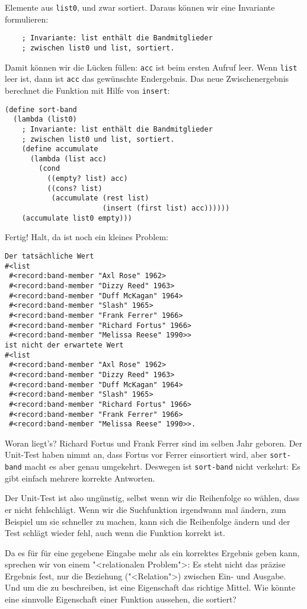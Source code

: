 Elemente aus \lstinline{list0}, und zwar sortiert.  Daraus können wir
eine Invariante formulieren:
%
\begin{lstlisting}
    ; Invariante: list enthält die Bandmitglieder
    ; zwischen list0 und list, sortiert.
\end{lstlisting}
%
Damit können wir die Lücken füllen: \lstinline{acc} ist beim ersten
Aufruf leer.  Wenn \lstinline{list} leer ist, dann ist \lstinline{acc}
das gewünschte Endergebnis.  Das neue Zwischenergebnis berechnet die
Funktion mit Hilfe von \lstinline{insert}:
%
\begin{lstlisting}
(define sort-band
  (lambda (list0)
    ; Invariante: list enthält die Bandmitglieder
    ; zwischen list0 und list, sortiert.
    (define accumulate     
      (lambda (list acc)
        (cond
          ((empty? list) acc)
          ((cons? list)
           (accumulate (rest list)
                       (insert (first list) acc))))))
    (accumulate list0 empty)))
\end{lstlisting}
%
Fertig! Halt, da ist noch ein kleines Problem:
%
\begin{verbatim}
Der tatsächliche Wert 
#<list
 #<record:band-member "Axl Rose" 1962>
 #<record:band-member "Dizzy Reed" 1963>
 #<record:band-member "Duff McKagan" 1964>
 #<record:band-member "Slash" 1965>
 #<record:band-member "Frank Ferrer" 1966>
 #<record:band-member "Richard Fortus" 1966>
 #<record:band-member "Melissa Reese" 1990>>
ist nicht der erwartete Wert 
#<list
 #<record:band-member "Axl Rose" 1962>
 #<record:band-member "Dizzy Reed" 1963>
 #<record:band-member "Duff McKagan" 1964>
 #<record:band-member "Slash" 1965>
 #<record:band-member "Richard Fortus" 1966>
 #<record:band-member "Frank Ferrer" 1966>
 #<record:band-member "Melissa Reese" 1990>>.
\end{verbatim}
%
Woran liegt's?  Richard Fortus und Frank Ferrer sind im selben Jahr
geboren.  Der Unit-Test haben nimmt an, dass Fortus vor Ferrer
einsortiert wird, aber \lstinline{sort-band} macht es aber genau
umgekehrt.  Deswegen ist \lstinline{sort-band} nicht verkehrt: Es gibt
einfach mehrere korrekte Antworten.

Der Unit-Test ist also ungünstig, selbst wenn wir die Reihenfolge so
wählen, dass er nicht fehlschlägt.  Wenn wir die Suchfunktion
irgendwann mal ändern, zum Beispiel um sie schneller zu machen, kann
sich die Reihenfolge ändern und der Test schlägt wieder fehl, auch
wenn die Funktion korrekt ist.

Da es für  für eine gegebene Eingabe mehr als ein
korrektes Ergebnis geben kann, sprechen wir von einem "<relationalen
Problem">: Es steht nicht das präzise
Ergebnis fest, nur die Beziehung ("<Relation">) zwischen Ein- und
Ausgabe.  Und um die zu beschreiben, ist eine Eigenschaft das richtige
Mittel.  Wie könnte eine sinnvolle Eigenschaft einer Funktion
aussehen, die sortiert?

